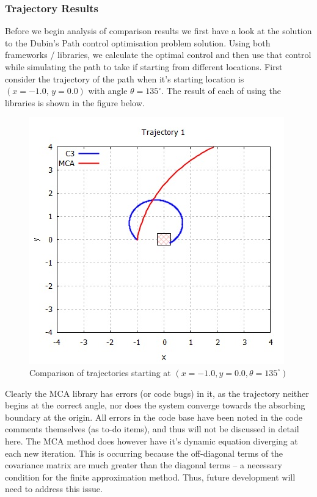 \documentclass[11pt,draftd]{article}
\begin{document}
\subsubsection{Trajectory Results} 
Before we begin analysis of comparison results we first have a look at the solution to the Dubin's Path control optimisation problem solution. Using both frameworks / libraries, we calculate the optimal control and then use that control while simulating the path to take if starting from different locations. First consider the trajectory of the path when it's starting location is $ (x = -1.0,\, y = 0.0)$ with angle $\theta = 135^{\circ} $. The result of each of using the libraries is shown in the figure below.

\begin{figure}[h!]
	\centering
	\includegraphics[scale=0.65]{images/traj1.jpg}
	\caption{Comparison of trajectories starting at $ (x=-1.0, y = 0.0, \theta = 135^{\circ}) $}
\end{figure}

Clearly the MCA library has errors (or code bugs) in it, as the trajectory neither begins at the correct angle, nor does the system converge towards the absorbing boundary at the origin. All errors in the code base have been noted in the code comments themselves (as to-do items), and thus will not be discussed in detail here. The MCA method does however have it's dynamic equation diverging at each new iteration. This is occurring because the off-diagonal terms of the covariance matrix are much greater than the diagonal terms -- a necessary condition for the finite approximation method. Thus, future development will need to address this issue. \\
\end{document}
